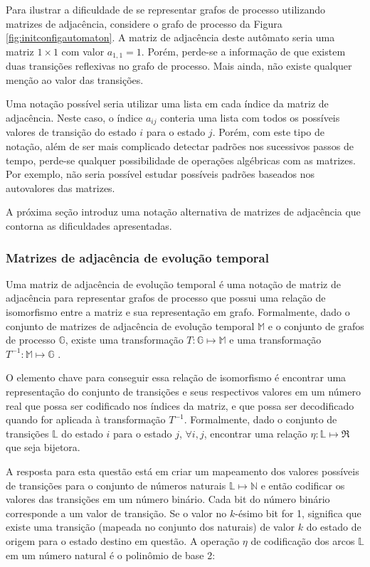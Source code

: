 \documentclass[12pt,a4paper]{article}
\begin{document}
Para ilustrar a dificuldade de se representar grafos de processo utilizando
matrizes de adjacência, considere o grafo de processo da Figura
\ref{fig:initconfigautomaton}. A matriz de adjacência deste autômato
seria uma matriz $1 \times 1$ com valor $a_{1,1}=1$. Porém, perde-se a informação
de que existem duas transições reflexivas no grafo de processo. Mais ainda,
não existe qualquer menção ao valor das transições.

Uma notação possível seria utilizar uma lista em cada índice da matriz de
adjacência. Neste caso, o índice $a_{ij}$ conteria uma lista com todos
os possíveis valores de transição do estado $i$ para o estado $j$.
Porém, com este tipo de notação, além de ser mais complicado
detectar padrões nos sucessivos passos de tempo, perde-se qualquer possibilidade
de operações algébricas com as matrizes. Por exemplo, não seria possível
estudar possíveis padrões baseados nos autovalores das matrizes.

A próxima seção introduz uma notação alternativa de matrizes de
adjacência que contorna as dificuldades apresentadas.

\subsubsection{Matrizes de adjacência de evolução temporal}

Uma matriz de adjacência de evolução temporal é uma notação de matriz de
adjacência para representar grafos de processo que possui uma relação
de isomorfismo entre a matriz e sua representação em grafo.
Formalmente, dado o conjunto de matrizes de adjacência
de evolução temporal $\mathbb{M}$ e o conjunto de grafos de processo $\mathbb{G}$,
existe uma transformação $T: \mathbb{G} \mapsto \mathbb{M}$ e uma
transformação $T^{-1}: \mathbb{M} \mapsto \mathbb{G}$ . 

O elemento chave para conseguir essa relação de isomorfismo
é encontrar uma representação do conjunto de transições e
seus respectivos valores em um número real que possa ser codificado
nos índices da matriz, e que possa ser decodificado quando for
aplicada à transformação $T^{-1}$. Formalmente, dado o conjunto de transições
$\mathbb{L}$ do estado $i$ para o estado $j$, $\forall i,j$, encontrar uma
relação $\eta:\mathbb{L} \mapsto \Re$ que seja bijetora.

A resposta para esta questão está em criar um mapeamento dos valores
possíveis de transições para o conjunto de números naturais
$\mathbb{L} \mapsto \mathbb{N}$ e então codificar os valores das transições
em um número binário. Cada bit do número binário corresponde a um valor de
transição. Se o valor no $k$-ésimo bit for 1, significa que existe uma
transição (mapeada no conjunto dos naturais) de valor $k$ do estado de
origem para o estado destino em questão. A operação $\eta$ de codificação dos
arcos $\mathbb{L}$ em um número natural é o polinômio de base 2:
\end{document}
